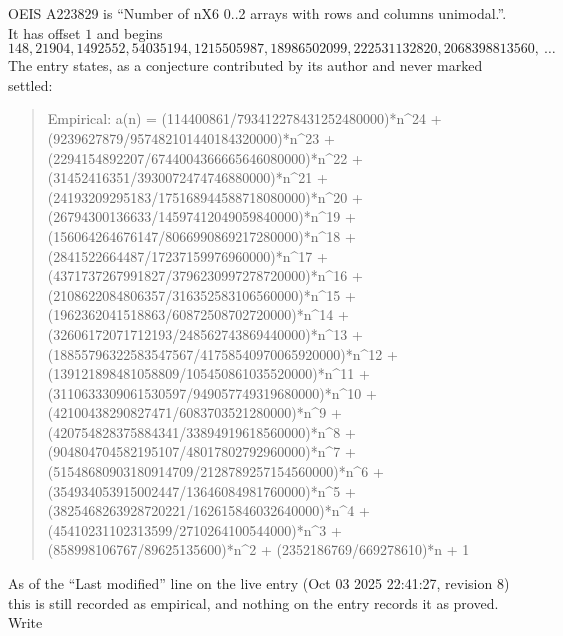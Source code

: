 \documentclass[11pt,a4paper]{article}
\theoremstyle{plain}
\theoremstyle{definition}
\begin{document}
OEIS A223829 is ``Number of nX6 0..2 arrays with rows and columns unimodal.''. It has offset $1$ and begins
\[
148, 21904, 1492552, 54035194, 1215505987, 18986502099, 222531132820, 2068398813560,\ \dots
\]
The entry states, as a conjecture contributed by its author and never marked settled:
\begin{quote}\raggedright\small
Empirical: a(n) = (114400861/793412278431252480000)*n\^{}24 + (9239627879/957482101440184320000)*n\^{}23 + (2294154892207/6744004366665646080000)*n\^{}22 + (31452416351/3930072474746880000)*n\^{}21 + (24193209295183/175168944588718080000)*n\^{}20 + (26794300136633/14597412049059840000)*n\^{}19 + (156064264676147/8066990869217280000)*n\^{}18 + (2841522664487/17237159976960000)*n\^{}17 + (4371737267991827/3796230997278720000)*n\^{}16 + (2108622084806357/316352583106560000)*n\^{}15 + (1962362041518863/60872508702720000)*n\^{}14 + (32606172071712193/248562743869440000)*n\^{}13 + (18855796322583547567/41758540970065920000)*n\^{}12 + (139121898481058809/105450861035520000)*n\^{}11 + (3110633309061530597/949057749319680000)*n\^{}10 + (42100438290827471/6083703521280000)*n\^{}9 + (420754828375884341/33894919618560000)*n\^{}8 + (904804704582195107/48017802792960000)*n\^{}7 + (51548680903180914709/2128789257154560000)*n\^{}6 + (354934053915002447/13646084981760000)*n\^{}5 + (3825468263928720221/162615846032640000)*n\^{}4 + (45410231102313599/2710264100544000)*n\^{}3 + (858998106767/89625135600)*n\^{}2 + (2352186769/669278610)*n + 1
\end{quote}
As of the ``Last modified'' line on the live entry (Oct 03 2025 22:41:27, revision 8) this is still
recorded as empirical, and nothing on the entry records it as proved. Write
\end{document}
